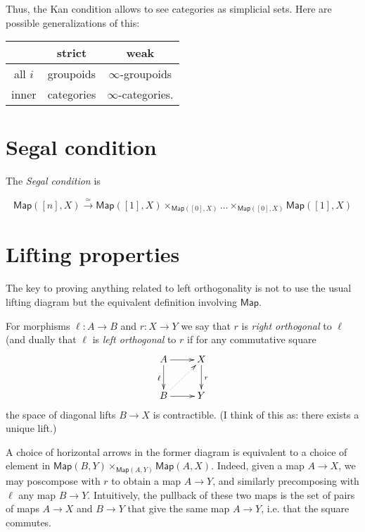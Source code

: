 Thus, the Kan condition allows to see categories
as simplicial sets. Here are possible generalizations
of this:

\begin{center}
\begin{tabular}{c | c | c}
& strict &weak\\
\hline
all $i$ & groupoids & $\infty$-groupoids\\
inner & categories & $\infty$-categories.
\end{tabular}
\end{center}

\section{Segal condition}
\label{section-segal-condition}

The {\it Segal condition} is

$$
\mathsf{Map}([n],X) \xrightarrow{\simeq}
\mathsf{Map}([1],X) \times_{\mathsf{Map}([0],X)}\ldots
\times_{\mathsf{Map}([0],X)}\mathsf{Map}([1],X)
$$

\section{Lifting properties}
\label{section-lifting-properties}

The key to proving anything related
to left orthogonality is not to use
the usual lifting diagram but
the equivalent definition involving $\mathsf{Map}$.

\begin{definition}
\label{definition-orthogonal}
For morphisms $\ell:A \to B$ and $r:X \to Y$ 
we say that $r$ is {\it right orthogonal} 
to $\ell$ (and dually that $\ell$ is 
{\it left orthogonal} to  $r$ if
for any commutative square
$$
\xymatrix{
A\ar[r]\ar[d]_{\ell}&X\ar[d]^{r}\\
B\ar@{.>}[ur]\ar[r]&Y
}
$$
the space of diagonal lifts $B \to X$ is contractible.
(I think of this as: there exists a unique lift.)
\end{definition}

\noindent
A choice of horizontal arrows in the former
diagram is equivalent to a choice of element in
$\mathsf{Map}(B,Y)\times_{\mathsf{Map}(A,Y)}\mathsf{Map}(A,X)$.
Indeed, given a map $A\to X$,
we may poscompose with $r$ to obtain
a map $A \to Y$, and similarly precomposing with 
$\ell$ any map $B \to Y$.
Intuitively, the pullback
of these two maps is the set of pairs
of maps $A \to X$ and $B \to Y$
that give the same map  $A \to Y$,
i.e. that the square commutes.

